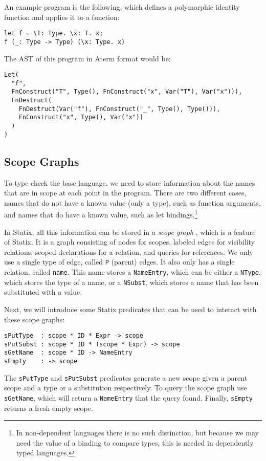 \documentclass[a4paper,UKenglish,cleveref, autoref, thm-restate]{oasics-v2021}
\begin{document}
An example program is the following, which defines a polymorphic identity function and applies it to a function:

\begin{lstlisting}
let f = \T: Type. \x: T. x;
f (_: Type -> Type) (\x: Type. x)
\end{lstlisting}
The AST of this program in Aterm format\cite{aterm} would be:
\begin{lstlisting}
Let(
  "f", 
  FnConstruct("T", Type(), FnConstruct("x", Var("T"), Var("x"))),
  FnDestruct(
	FnDestruct(Var("f"), FnConstruct("_", Type(), Type())),
	FnConstruct("x", Type(), Var("x"))
  )
)
\end{lstlisting}



\subsection{Scope Graphs}
\label{sec:coc-scopes}

To type check the base language, we need to store information about the names that are in scope at each point in the program. There are two different cases, names that do not have a known value (only a type), such as function arguments, and names that do have a known value, such as let bindings.\footnote{In non-dependent languages there is no such distinction, but because we may need the value of a binding to compare types, this is needed in dependently typed languages.}

In Statix, all this information can be stored in a \emph{scope graph} \cite{scope_graphs}, which is a feature of Statix. It is a graph consisting of nodes for scopes, labeled edges for visibility relations, scoped declarations for a relation, and queries for references. We only use a single type of edge, called \verb|P| (parent) edges. It also only has a single relation, called \verb|name|. This name stores a \verb|NameEntry|, which can be either a \verb|NType|, which stores the type of a name, or a \verb|NSubst|, which stores a name that has been substituted with a value. 

Next, we will introduce some Statix predicates that can be used to interact with these scope graphs:

\begin{lstlisting}
sPutType  : scope * ID * Expr -> scope
sPutSubst : scope * ID * (scope * Expr) -> scope
sGetName  : scope * ID -> NameEntry
sEmpty    : -> scope
\end{lstlisting}
The \verb|sPutType| and \verb|sPutSubst| predicates generate a new scope given a parent scope and a type or a substitution respectively. To query the scope graph use \verb|sGetName|, which will return a \verb|NameEntry| that the query found. Finally, \verb|sEmpty| returns a fresh empty scope.
\end{document}
